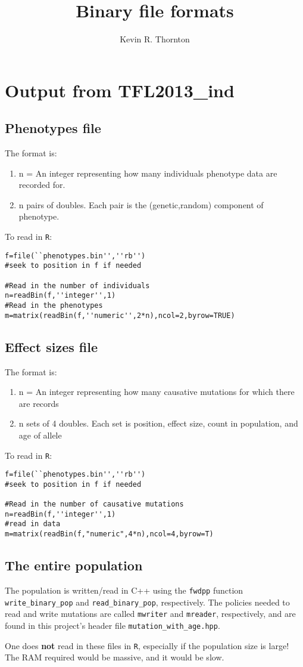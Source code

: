 \documentclass{article}
\author{Kevin R. Thornton}
\title{Binary file formats}
\begin{document}
\maketitle

\section*{Output from TFL2013\_ind}
\subsection*{Phenotypes file}
The format is:
\begin{enumerate}
\item n = An integer representing how many individuals phenotype data are recorded for.
\item n pairs of doubles.  Each pair is the (genetic,random) component of phenotype.
\end{enumerate}

To read in \texttt{R}:

\begin{lstlisting}
f=file(``phenotypes.bin'',''rb'')
#seek to position in f if needed

#Read in the number of individuals
n=readBin(f,''integer'',1)
#Read in the phenotypes
m=matrix(readBin(f,''numeric'',2*n),ncol=2,byrow=TRUE)
\end{lstlisting}

\subsection*{Effect sizes file}

The format is:
\begin{enumerate}
\item n = An integer representing how many causative mutations for which there are records
\item n sets of 4 doubles.  Each set is position, effect size, count in population, and age of allele
\end{enumerate}

To read in \texttt{R}:
\begin{lstlisting}
f=file(``phenotypes.bin'',''rb'')
#seek to position in f if needed

#Read in the number of causative mutations
n=readBin(f,''integer'',1)
#read in data
m=matrix(readBin(f,"numeric",4*n),ncol=4,byrow=T)
\end{lstlisting}

\subsection*{The entire population}
The population is written/read in C++ using the \texttt{fwdpp} function \texttt{write\_binary\_pop} and \texttt{read\_binary\_pop}, respectively.  The policies needed to read and write mutations are called \texttt{mwriter} and \texttt{mreader}, respectively, and are found in this project's header file \texttt{mutation\_with\_age.hpp}.

One does \textbf{not} read in these files in \texttt{R}, especially if the population size is large!  The RAM required would be massive, and it would be slow.
\end{document}
